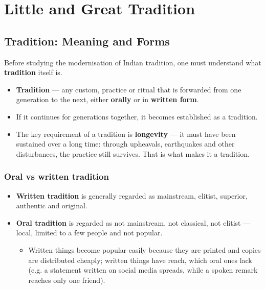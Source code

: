 \chapter{Little and Great Tradition}

\section{Tradition: Meaning and Forms}

Before studying the modernisation of Indian tradition, one must understand what \textbf{tradition} itself is.

\begin{KeyConcept}
\begin{itemize}
\item \textbf{Tradition} --- any custom, practice or ritual that is forwarded from one generation to the next, either \textbf{orally} or in \textbf{written form}.
\item If it continues for generations together, it becomes established as a tradition.
\item The key requirement of a tradition is \textbf{longevity} --- it must have been sustained over a long time: through upheavals, earthquakes and other disturbances, the practice still survives. That is what makes it a tradition.
\end{itemize}
\end{KeyConcept}

\subsection{Oral vs written tradition}

\begin{itemize}
\item \textbf{Written tradition} is generally regarded as mainstream, elitist, superior, authentic and original.
\item \textbf{Oral tradition} is regarded as not mainstream, not classical, not elitist --- local, limited to a few people and not popular.
\begin{itemize}
\item Written things become popular easily because they are printed and copies are distributed cheaply; written things have reach, which oral ones lack (e.g. a statement written on social media spreads, while a spoken remark reaches only one friend).
\end{itemize}
\end{itemize}

